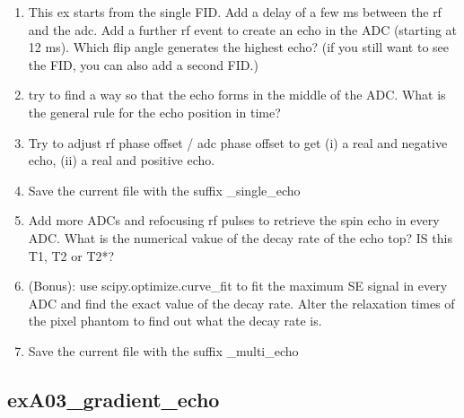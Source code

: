 \documentclass[a4paper,12pt]{extarticle}
\begin{document}
\begin{enumerate}
\item  	This ex starts from the single FID. Add a delay of a few ms between the rf and the adc.
		Add a further rf event to create an echo in the ADC (starting at 12 ms). Which flip angle generates the highest echo? (if you still want to see the FID, you can also add a second FID.)
\item  	try to find a way so that the echo forms in the middle of the ADC. What is the general rule for the echo position in time?
\item  	Try to adjust rf phase offset / adc phase offset to get (i) a real and negative echo, (ii) a real and positive echo.

\item Save the current file with the suffix \_single\_echo

\item  	Add more ADCs and refocusing rf pulses to retrieve the spin echo in every ADC. What is the numerical vakue of the decay rate of the echo top?  IS this T1, T2  or T2*?

\item	(Bonus): use scipy.optimize.curve\_fit to fit the maximum SE signal in every ADC and find the exact value of the decay rate. Alter the relaxation times of the pixel phantom to find out what the decay rate is.

\item Save the current file with the suffix \_multi\_echo

\end{enumerate}

\subsection{exA03\_gradient\_echo}
\end{document}

